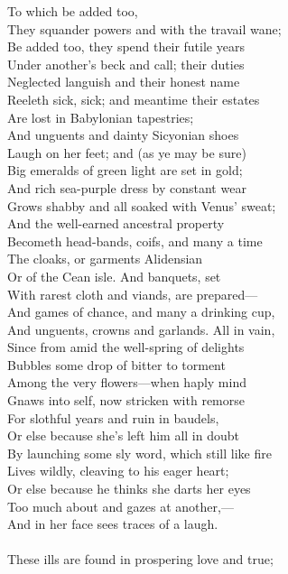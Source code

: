 To which be added too,\\
They squander powers and with the travail wane;\\
Be added too, they spend their futile years\\
Under another's beck and call; their duties\\
Neglected languish and their honest name\\
Reeleth sick, sick; and meantime their estates\\
Are lost in Babylonian tapestries;\\
And unguents and dainty Sicyonian shoes\\
Laugh on her feet; and (as ye may be sure)\\
Big emeralds of green light are set in gold;\\
And rich sea-purple dress by constant wear\\
Grows shabby and all soaked with Venus' sweat;\\
And the well-earned ancestral property\\
Becometh head-bands, coifs, and many a time\\
The cloaks, or garments Alidensian\\
Or of the Cean isle. And banquets, set\\
With rarest cloth and viands, are prepared—\\
And games of chance, and many a drinking cup,\\
And unguents, crowns and garlands. All in vain,\\
Since from amid the well-spring of delights\\
Bubbles some drop of bitter to torment\\
Among the very flowers—when haply mind\\
Gnaws into self, now stricken with remorse\\
For slothful years and ruin in baudels,\\
Or else because she's left him all in doubt\\
By launching some sly word, which still like fire\\
Lives wildly, cleaving to his eager heart;\\
Or else because he thinks she darts her eyes\\
Too much about and gazes at another,—\\
And in her face sees traces of a laugh.\\
\\
These ills are found in prospering love and true;\\
